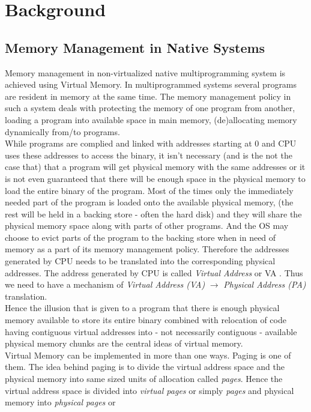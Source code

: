 \chapter{Background}
\section{Memory Management in Native Systems} \label{native}
Memory management in non-virtualized native multiprogramming system is achieved using Virtual
Memory. In multiprogrammed systems several programs are resident in memory at the same time.
The memory management policy in such a system deals with protecting the memory of one program from 
another, loading a program into available space in main memory, (de)allocating memory dynamically
from/to programs.\\
While programs are complied and linked with addresses starting at $0$ and CPU uses 
these addresses to access the binary, it isn't necessary (and is the not the case that) that a
program will get physical memory with the same addresses or it is not even guaranteed that there
will be enough space in the physical memory to load the entire binary of the program. Most of the
times only the immediately needed part of the program is loaded onto the available physical
memory, (the rest will be held in a backing store - often the hard disk) and they will share the
physical memory space along with parts of other programs. And the OS may choose to evict parts of
the program to the backing store when in need of memory as a part of its memory management policy.
Therefore the addresses generated by CPU needs to be translated into the corresponding physical
addresses. The address generated by CPU is called \textit{Virtual Address} or VA . Thus we need to
have a mechanism of \textit{Virtual Address (VA)} $\rightarrow$ \textit{Physical Address (PA)}
translation.\\
Hence the illusion that is given to a program that there is enough physical memory available to
store its entire binary combined with relocation of code having contiguous virtual addresses into
- not necessarily contiguous - available physical memory chunks are the central ideas of virtual
memory.\\
Virtual Memory can be implemented in more than one ways. Paging is one of them. The idea behind
paging is to divide the virtual address space and the physical memory into same sized units of
allocation called \textit{pages}. Hence the virtual address space is divided into \textit{virtual
pages} or simply \textit{pages} and physical memory into \textit{physical pages} or
